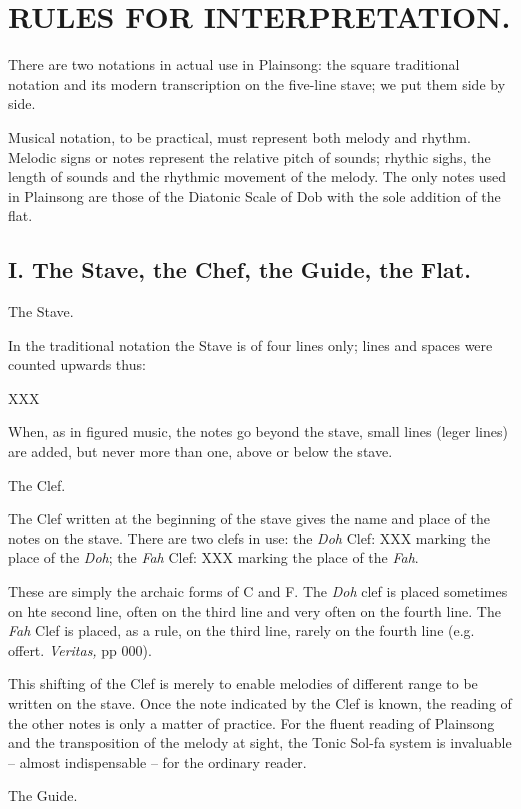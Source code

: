 \section{RULES FOR INTERPRETATION.}

There are two notations in actual use in Plainsong: the square traditional notation and its modern transcription on the five-line stave; we put them side by side.

Musical notation, to be practical, must represent both melody and rhythm. Melodic signs or notes represent the relative pitch of sounds; rhythic sighs, the length of sounds and the rhythmic movement of the melody. The only notes used in Plainsong are those of the Diatonic Scale of Dob with the sole addition of the flat.

\subsection{I. The Stave, the Chef, the Guide, the Flat.}

The Stave.

In the traditional notation the Stave is of four lines only; lines and spaces were counted upwards thus:

XXX

When, as in figured music, the notes go beyond the stave, small lines (leger lines) are added, but never more than one, above or below the stave.

The Clef.

The Clef written at the beginning of the stave gives the name and place of the notes on the stave. There are two clefs in use: the {\it Doh} Clef: XXX marking the place of the {\it Doh}; the {\it Fah} Clef: XXX marking the place of the {\it Fah}.

These are simply the archaic forms of C and F. The {\it Doh} clef is placed sometimes on hte second line, often on the third line and very often on the fourth line. The {\it Fah} Clef is placed, as a rule, on the third line, rarely on the fourth line (e.g. offert. {\it Veritas,} pp 000).

This shifting of the Clef is merely to enable melodies of different range to be written on the stave. Once the note indicated by the Clef is known, the reading of the other notes is only a matter of practice. For the fluent reading of Plainsong and the transposition of the melody at sight, the Tonic Sol-fa system is invaluable -- almost indispensable -- for the ordinary reader.

The Guide.


